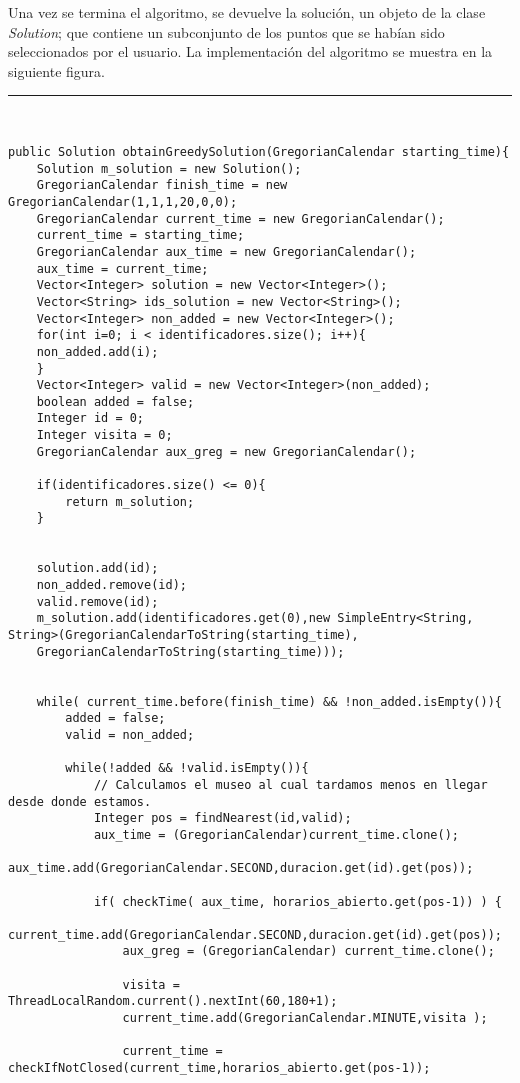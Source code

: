 Una vez se termina el algoritmo, se devuelve la solución, un objeto de la clase \textit{Solution}; que contiene un subconjunto de los puntos que se habían sido seleccionados por el usuario. La implementación del algoritmo se muestra en la siguiente figura.\newline
\noindent\rule[-1ex]{\textwidth}{1pt}\\
\begin{lstlisting}[caption=Función para encontrar la ruta entre los puntos seleccionados.]
public Solution obtainGreedySolution(GregorianCalendar starting_time){
	Solution m_solution = new Solution();
	GregorianCalendar finish_time = new GregorianCalendar(1,1,1,20,0,0);
	GregorianCalendar current_time = new GregorianCalendar();
	current_time = starting_time;
	GregorianCalendar aux_time = new GregorianCalendar();
	aux_time = current_time;
	Vector<Integer> solution = new Vector<Integer>();
	Vector<String> ids_solution = new Vector<String>();
	Vector<Integer> non_added = new Vector<Integer>();
	for(int i=0; i < identificadores.size(); i++){
	non_added.add(i);
	}
	Vector<Integer> valid = new Vector<Integer>(non_added);
	boolean added = false;
	Integer id = 0;
	Integer visita = 0;
	GregorianCalendar aux_greg = new GregorianCalendar();
	
	if(identificadores.size() <= 0){
		return m_solution;
	}
	

	solution.add(id);
	non_added.remove(id);
	valid.remove(id);
	m_solution.add(identificadores.get(0),new SimpleEntry<String, String>(GregorianCalendarToString(starting_time),
	GregorianCalendarToString(starting_time)));
	
	
	while( current_time.before(finish_time) && !non_added.isEmpty()){
		added = false;
		valid = non_added;
	
		while(!added && !valid.isEmpty()){
			// Calculamos el museo al cual tardamos menos en llegar desde donde estamos.
			Integer pos = findNearest(id,valid);
			aux_time = (GregorianCalendar)current_time.clone();
			aux_time.add(GregorianCalendar.SECOND,duracion.get(id).get(pos));
			
			if( checkTime( aux_time, horarios_abierto.get(pos-1)) ) {
				current_time.add(GregorianCalendar.SECOND,duracion.get(id).get(pos));
				aux_greg = (GregorianCalendar) current_time.clone();
				
				visita = ThreadLocalRandom.current().nextInt(60,180+1);
				current_time.add(GregorianCalendar.MINUTE,visita );
				
				current_time = checkIfNotClosed(current_time,horarios_abierto.get(pos-1));
				

\end{lstlisting}
